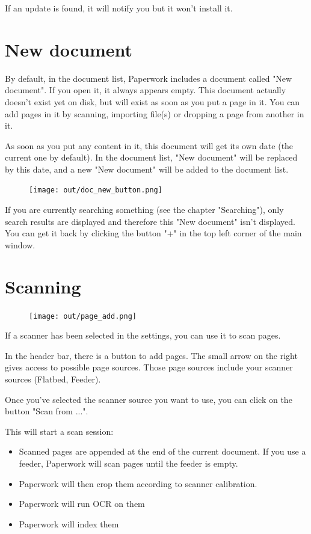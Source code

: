 \documentclass[10pt,a4paper]{article}
\begin{document}
If an update is found, it will notify you but it won't install it.


\section{New document}

By default, in the document list, Paperwork includes a document called
"New document". If you open it, it always appears empty. This document actually
doesn't exist yet on disk, but will exist as soon as you put a page in it.
You can add pages in it by scanning, importing file(s) or dropping a page from
another in it.

As soon as you put any content in it, this document will get its own date
(the current one by default). In the document list, "New document" will be
replaced by this date, and a new "New document" will be added to the document
list.

\begin{figure}[H]
	\texttt{[image: out/doc\_new\_button.png]}
\end{figure}

If you are currently searching something (see the chapter "Searching"),
only search results are displayed and therefore this "New document" isn't
displayed. You can get it back by clicking the button "+" in the top left
corner of the main window.


\section{Scanning}

\begin{figure}[H]
	\texttt{[image: out/page\_add.png]}
\end{figure}

If a scanner has been selected in the settings, you can use it to scan pages.

In the header bar, there is a button to add pages. The small arrow on the right
gives access to possible page sources. Those page sources include your scanner
sources (Flatbed, Feeder).

Once you've selected the scanner source you want to use, you can click on the
button "Scan from ...".

This will start a scan session:

\begin{itemize}
	\item Scanned pages are appended at the end of the current document.
		If you use a feeder, Paperwork will scan pages until the feeder
		is empty.
	\item Paperwork will then crop them according to scanner calibration.
	\item Paperwork will run OCR on them
	\item Paperwork will index them
\end{itemize}
\end{document}
